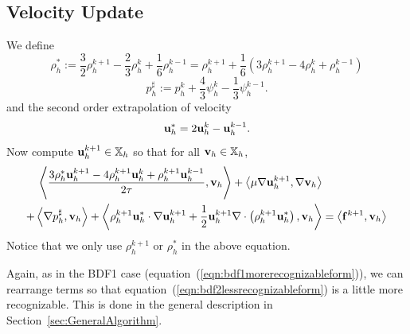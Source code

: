 \documentclass[letterpaper]{erdc}
\begin{document}
\subsection{Velocity Update}
We define
\begin{equation}
  \rho_h^{*} := \frac{3}{2}\rho_h^{k+1} - \frac{2}{3}\rho_h^{k} + \frac{1}{6}\rho_h^{k-1} = \rho_h^{k+1} + \frac{1}{6}\left(3\rho_h^{k+1} -4\rho_h^{k} + \rho_h^{k-1} \right)
\end{equation}
\begin{equation}
  p_h^{\sharp} := p_h^{k} + \frac{4}{3}\psi_h^{k} - \frac{1}{3}\psi_h^{k-1}.
\end{equation}
and the second order extrapolation of velocity
\begin{equation}\label{eq:velocityextrapolation_uniformtimestep}
  \textbf{u}^{*}_h = 2\textbf{u}_h^{k}  - \textbf{u}_h^{k-1}.
\end{equation}
Now compute $\textbf{u}_h^{k+1}\in\mathbb{X}_h$ so that for all $\textbf{v}_h\in\mathbb{X}_h$,
\begin{equation}\label{eqn:bdf2lessrecognizableform}
  \begin{split}
    \left\langle \frac{3\rho_h^{*}\textbf{u}_h^{k+1} - 4\rho_h^{k+1}\textbf{u}_h^{k} + \rho_h^{k+1}\textbf{u}_h^{k-1}}{2\tau}, \textbf{v}_h \right\rangle  + \left\langle \mu\nabla\textbf{u}_h^{k+1}, \nabla\textbf{v}_h \right\rangle &\\
   + \left\langle \nabla p_h^{\sharp}, \textbf{v}_h \right\rangle + \left\langle \rho_h^{k+1}\textbf{u}_h^{*}\cdot\nabla\textbf{u}_h^{k+1} + \frac{1}{2}\textbf{u}_h^{k+1}\nabla\cdot\left( \rho_h^{k+1}\textbf{u}_h^{*} \right), \textbf{v}_h \right\rangle &= \left\langle \mathbf{f}^{k+1}, \textbf{v}_h \right\rangle
  \end{split}
\end{equation}
Notice that we only use $\rho_h^{k+1}$ or $\rho_h^{*}$ in the above equation.

\begin{remark}
  Again, as in the BDF1 case (equation~(\ref{eqn:bdf1morerecognizableform})),
  we can rearrange terms so that equation~(\ref{eqn:bdf2lessrecognizableform})
  is a little more recognizable.  This is done in the general description in
  Section~\ref{sec:GeneralAlgorithm}.
\end{remark}
\end{document}
